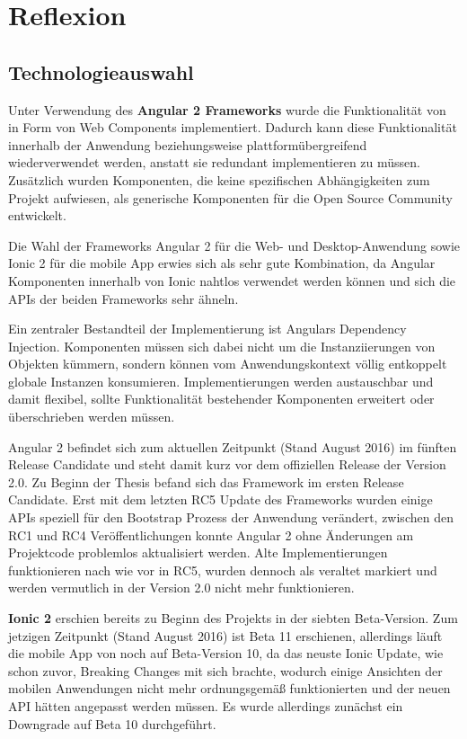 
\chapter{Reflexion}

\label{chap:reflexion}

\section{Technologieauswahl}

Unter Verwendung des \textbf{Angular 2 Frameworks} wurde die Funktionalität von \projectname{} in Form von
Web Components implementiert.
Dadurch kann diese Funktionalität innerhalb der Anwendung beziehungsweise plattformübergreifend wiederverwendet werden, anstatt sie redundant implementieren zu müssen.
Zusätzlich wurden Komponenten, die keine spezifischen Abhängigkeiten zum Projekt aufwiesen, als
generische Komponenten für die Open Source Community entwickelt.

Die Wahl der Frameworks Angular 2 für die Web- und Desktop-Anwendung sowie Ionic 2 für
die mobile App erwies sich als sehr gute Kombination,
da Angular Komponenten innerhalb von Ionic nahtlos verwendet werden können
und sich die APIs der beiden Frameworks sehr ähneln.

Ein zentraler Bestandteil der Implementierung ist Angulars Dependency Injection.
Komponenten müssen sich dabei nicht um die Instanziierungen von Objekten kümmern,
sondern können vom Anwendungskontext völlig entkoppelt globale Instanzen konsumieren.
Implementierungen werden austauschbar und damit flexibel,
sollte Funktionalität bestehender Komponenten erweitert oder überschrieben werden müssen.

Angular 2 befindet sich zum aktuellen Zeitpunkt (Stand August 2016) im fünften Release Candidate und steht damit kurz
vor dem offiziellen Release der Version 2.0. Zu Beginn der Thesis befand sich das Framework im ersten Release Candidate.
Erst mit dem letzten RC5 Update des Frameworks wurden einige APIs speziell für den Bootstrap Prozess der Anwendung verändert,
zwischen den RC1 und RC4 Veröffentlichungen konnte Angular 2 ohne Änderungen am Projektcode problemlos
aktualisiert werden. Alte Implementierungen funktionieren nach wie vor in RC5,
wurden dennoch als veraltet markiert und werden vermutlich in der Version 2.0 nicht mehr
funktionieren.


\textbf{Ionic 2} erschien bereits zu Beginn des Projekts in der siebten Beta-Version.
Zum jetzigen Zeitpunkt (Stand August 2016) ist Beta 11 erschienen, allerdings läuft die mobile App von
\projectname{} noch auf Beta-Version 10, da das neuste Ionic Update,
wie schon zuvor, Breaking Changes mit sich brachte, wodurch einige Ansichten der
mobilen Anwendungen nicht mehr ordnungsgemäß funktionierten und der neuen API hätten angepasst werden müssen.
Es wurde allerdings zunächst ein Downgrade auf Beta 10 durchgeführt.

